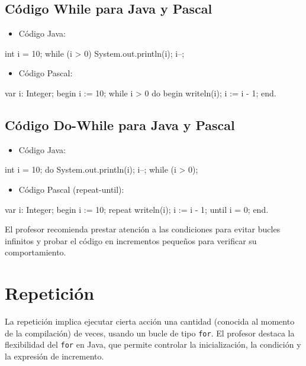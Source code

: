 \documentclass[a4paper]{report}
\begin{document}
\subsection{Código While para Java y Pascal}

\begin{itemize}
    \item Código Java:
\end{itemize}

\begin{roundedlst}
int i = 10;
while (i > 0) {
    System.out.println(i);
    i--;
}
\end{roundedlst}

\begin{itemize}
    \item Código Pascal:
\end{itemize}

\begin{roundedlst}
var
  i: Integer;
begin
  i := 10;
  while i > 0 do
  begin
    writeln(i);
    i := i - 1;
  end.
\end{roundedlst}


\subsection{Código Do-While para Java y Pascal}

\begin{itemize}
    \item Código Java:
\end{itemize}

\begin{roundedlst}
int i = 10;
do {
    System.out.println(i);
    i--;
} while (i > 0);
\end{roundedlst}

\begin{itemize}
    \item Código Pascal (repeat-until):
\end{itemize}

\begin{roundedlst}
var
  i: Integer;
begin
  i := 10;
  repeat
    writeln(i);
    i := i - 1;
  until i = 0;
end.
\end{roundedlst}

El profesor recomienda prestar atención a las condiciones para evitar bucles infinitos y probar el código en incrementos pequeños para verificar su comportamiento.

\section{Repetición}
La repetición implica ejecutar cierta acción una cantidad (conocida al momento de la compilación) de veces, usando un bucle de tipo \texttt{for}. El profesor destaca la flexibilidad del \texttt{for} en Java, que permite controlar la inicialización, la condición y la expresión de incremento.
\end{document}
